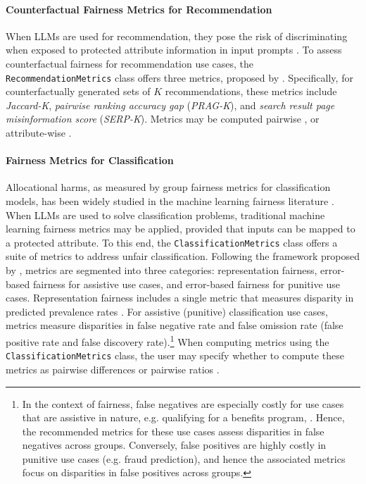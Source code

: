 \documentclass[
]{article}
\begin{document}
\paragraph{Counterfactual Fairness Metrics for Recommendation}
When LLMs are used for recommendation, they pose the risk of discriminating when exposed to protected attribute information in input prompts \cite{Zhang_2023}. To assess counterfactual fairness for recommendation use cases, the \texttt{RecommendationMetrics} class offers three metrics, proposed by \cite{Zhang_2023}. Specifically, for counterfactually generated sets of $K$ recommendations, these metrics include \textit{Jaccard-K}, \textit{pairwise ranking accuracy gap} (\textit{PRAG-K}), and \textit{search result page misinformation score} (\textit{SERP-K}). Metrics may be computed pairwise \cite{bouchard2024actionableframeworkassessingbias}, or attribute-wise \cite{Zhang_2023}.

\paragraph{Fairness Metrics for Classification}
Allocational harms, as measured by group fairness metrics for classification models, has been widely studied in the machine learning fairness literature \cite{2018aequitas, aif360-oct-2018, Weerts_Fairlearn_Assessing_and_2023, feldman2015certifyingremovingdisparateimpact, 10.5555/3120007.3120011, hardt2016equalityopportunitysupervisedlearning, pleiss2017fairnesscalibration, 10.1109/ICDM.2012.45, agarwal2018reductionsapproachfairclassification, zhang2018mitigatingunwantedbiasesadversarial}. When LLMs are used to solve classification problems, traditional machine learning fairness metrics may be applied, provided that inputs can be mapped to a protected attribute. To this end, the \texttt{ClassificationMetrics} class offers a suite of metrics to address unfair classification. Following the framework proposed by \cite{2018aequitas}, metrics are segmented into three categories: representation fairness, error-based fairness for assistive use cases, and error-based fairness for punitive use cases. Representation fairness includes a single metric that measures disparity in predicted prevalence rates \cite{feldman2015certifyingremovingdisparateimpact, 2018aequitas}. For assistive (punitive) classification use cases, metrics measure disparities in false negative rate and false omission rate (false positive rate and false discovery rate).\footnote{In the context of fairness, false negatives are especially costly for use cases that are assistive in nature, e.g. qualifying for a benefits program, . Hence, the recommended metrics for these use cases assess disparities in false negatives across groups. Conversely, false positives are highly costly in punitive use cases (e.g. fraud prediction), and hence the associated metrics focus on disparities in false positives across groups.} When computing metrics using the \texttt{ClassificationMetrics} class, the user may specify whether to compute these metrics as pairwise differences \cite{aif360-oct-2018} or pairwise ratios \cite{2018aequitas}.
\end{document}
